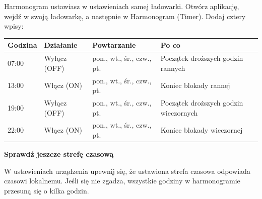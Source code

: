 \documentclass[11pt]{article}
\begin{document}
\clearpage


Harmonogram ustawiasz w ustawieniach samej ładowarki. Otwórz aplikację, wejdź w swoją ładowarkę, a następnie w Harmonogram (Timer). Dodaj cztery wpisy:

\vspace{0.2cm}
\begin{tabularx}{\textwidth}{@{}p{2.2cm}p{3.2cm}p{3.6cm}X@{}}
\toprule
\textbf{\color{apnavy}Godzina} & \textbf{\color{apnavy}Działanie} & \textbf{\color{apnavy}Powtarzanie} & \textbf{\color{apnavy}Po co}\\
\midrule
07:00 & Wyłącz (OFF) & pon., wt., śr., czw., pt. & Początek droższych godzin rannych\\
13:00 & Włącz (ON) & pon., wt., śr., czw., pt. & Koniec blokady rannej\\
19:00 & Wyłącz (OFF) & pon., wt., śr., czw., pt. & Początek droższych godzin wieczornych\\
22:00 & Włącz (ON) & pon., wt., śr., czw., pt. & Koniec blokady wieczornej\\
\bottomrule
\end{tabularx}



\vspace{0.4cm}
{\bfseries\color{apnavy}\large Sprawdź jeszcze strefę czasową}

W ustawieniach urządzenia upewnij się, że ustawiona strefa czasowa odpowiada czasowi lokalnemu. Jeśli się nie zgadza, wszystkie godziny w harmonogramie przesuną się o kilka godzin.

\clearpage

\end{document}
